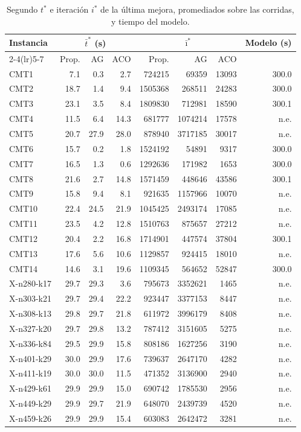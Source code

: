 \begin{table}[htbp]
\centering
\small
\begin{tabular}{lrrrrrrr}
\toprule
Instancia & \multicolumn{3}{c}{$\bar t^*$ (s)} & \multicolumn{3}{c}{$\bar\imath^*$} & Modelo (s) \\
\cmidrule(lr){2-4}\cmidrule(lr){5-7}
 & Prop. & AG & ACO & Prop. & AG & ACO & \\
\midrule
CMT1 & 7.1 & 0.3 & 2.7 & 724215 & 69359 & 13093 & 300.0 \\
CMT2 & 18.7 & 1.4 & 9.4 & 1505368 & 268511 & 24283 & 300.0 \\
CMT3 & 23.1 & 3.5 & 8.4 & 1809830 & 712981 & 18590 & 300.1 \\
CMT4 & 11.5 & 6.4 & 14.3 & 681777 & 1074214 & 17578 & n.e. \\
CMT5 & 20.7 & 27.9 & 28.0 & 878940 & 3717185 & 30017 & n.e. \\
CMT6 & 15.7 & 0.2 & 1.8 & 1524192 & 54891 & 9317 & 300.0 \\
CMT7 & 16.5 & 1.3 & 0.6 & 1292636 & 171982 & 1653 & 300.0 \\
CMT8 & 21.6 & 2.7 & 14.8 & 1571459 & 448646 & 43586 & 300.1 \\
CMT9 & 15.8 & 9.4 & 8.1 & 921635 & 1157966 & 10070 & n.e. \\
CMT10 & 22.4 & 24.5 & 21.9 & 1045425 & 2493174 & 17085 & n.e. \\
CMT11 & 23.5 & 4.2 & 12.8 & 1510763 & 875657 & 27212 & n.e. \\
CMT12 & 20.4 & 2.2 & 16.8 & 1714901 & 447574 & 37804 & 300.1 \\
CMT13 & 17.6 & 5.6 & 10.6 & 1129857 & 924415 & 18010 & n.e. \\
CMT14 & 14.6 & 3.1 & 19.6 & 1109345 & 564652 & 52847 & 300.0 \\
X-n280-k17 & 29.7 & 29.3 & 3.6 & 795673 & 3352621 & 1465 & n.e. \\
X-n303-k21 & 29.7 & 29.4 & 22.2 & 923447 & 3377153 & 8447 & n.e. \\
X-n308-k13 & 29.8 & 29.7 & 21.8 & 611972 & 3996179 & 8408 & n.e. \\
X-n327-k20 & 29.7 & 29.8 & 13.2 & 787412 & 3151605 & 5275 & n.e. \\
X-n336-k84 & 29.5 & 29.9 & 15.8 & 808186 & 1627256 & 3190 & n.e. \\
X-n401-k29 & 30.0 & 29.9 & 17.6 & 739637 & 2647170 & 4282 & n.e. \\
X-n411-k19 & 30.0 & 30.0 & 11.5 & 471352 & 3136900 & 2940 & n.e. \\
X-n429-k61 & 29.9 & 29.9 & 15.0 & 690742 & 1785530 & 2956 & n.e. \\
X-n449-k29 & 29.9 & 29.7 & 21.9 & 648070 & 2439739 & 4520 & n.e. \\
X-n459-k26 & 29.9 & 29.9 & 15.4 & 603083 & 2642472 & 3281 & n.e. \\
\bottomrule
\end{tabular}
\caption{Segundo $t^*$ e iteración $i^*$ de la última mejora, promediados sobre las corridas, y tiempo del modelo.}
\label{tab:comparacion_tiempo}
\end{table}

